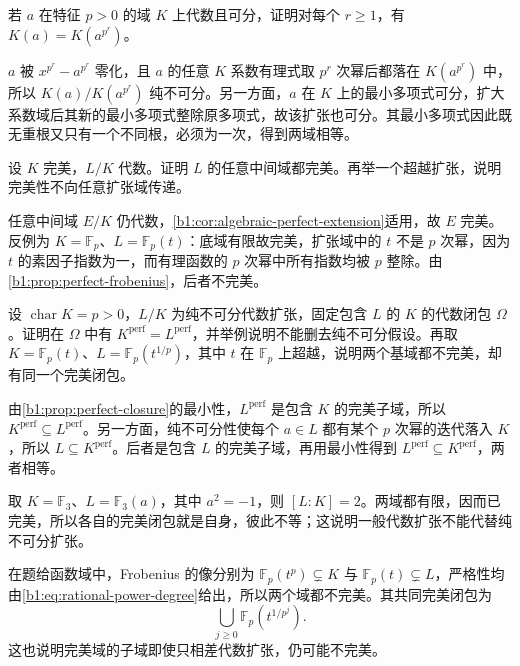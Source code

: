 \begin{exercise}\label{b1:ex:16-7}
	若 \(a\) 在特征 \(p>0\) 的域 \(K\) 上代数且可分，证明对每个 \(r\geq1\)，有 \(K(a)=K(a^{p^r})\)。
\end{exercise}
\begin{solution}
	\(a\) 被 \(x^{p^r}-a^{p^r}\) 零化，且 \(a\) 的任意 \(K\) 系数有理式取 \(p^r\) 次幂后都落在 \(K(a^{p^r})\) 中，所以 \(K(a)/K(a^{p^r})\) 纯不可分。另一方面，\(a\) 在 \(K\) 上的最小多项式可分，扩大系数域后其新的最小多项式整除原多项式，故该扩张也可分。其最小多项式因此既无重根又只有一个不同根，必须为一次，得到两域相等。
\end{solution}

\begin{exercise}\label{b1:ex:16-8}
	设 \(K\) 完美，\(L/K\) 代数。证明 \(L\) 的任意中间域都完美。再举一个超越扩张，说明完美性不向任意扩张域传递。
\end{exercise}
\begin{solution}
	任意中间域 \(E/K\) 仍代数，\cref{b1:cor:algebraic-perfect-extension}适用，故 \(E\) 完美。反例为 \(K=\mathbb F_p\)、\(L=\mathbb F_p(t)\)：底域有限故完美，扩张域中的 \(t\) 不是 \(p\) 次幂，因为 \(t\) 的素因子指数为一，而有理函数的 \(p\) 次幂中所有指数均被 \(p\) 整除。由\cref{b1:prop:perfect-frobenius}，后者不完美。
\end{solution}

\begin{exercise}\label{b1:ex:16-9}
	设 \(\operatorname{char}K=p>0\)，\(L/K\) 为纯不可分代数扩张，固定包含 \(L\) 的 \(K\) 的代数闭包 \(\Omega\)。证明在 \(\Omega\) 中有 \(K^{\mathrm{perf}}=L^{\mathrm{perf}}\)，并举例说明不能删去纯不可分假设。再取 \(K=\mathbb F_p(t)\)、\(L=\mathbb F_p(t^{1/p})\)，其中 \(t\) 在 \(\mathbb F_p\) 上超越，说明两个基域都不完美，却有同一个完美闭包。
\end{exercise}
\begin{solution}
	由\cref{b1:prop:perfect-closure}的最小性，\(L^{\mathrm{perf}}\) 是包含 \(K\) 的完美子域，所以 \(K^{\mathrm{perf}}\subseteq L^{\mathrm{perf}}\)。另一方面，纯不可分性使每个 \(a\in L\) 都有某个 \(p\) 次幂的迭代落入 \(K\)，所以 \(L\subseteq K^{\mathrm{perf}}\)。后者是包含 \(L\) 的完美子域，再用最小性得到 \(L^{\mathrm{perf}}\subseteq K^{\mathrm{perf}}\)，两者相等。

	取 \(K=\mathbb F_3\)、\(L=\mathbb F_3(a)\)，其中 \(a^2=-1\)，则 \([L:K]=2\)。两域都有限，因而已完美，所以各自的完美闭包就是自身，彼此不等；这说明一般代数扩张不能代替纯不可分扩张。

	在题给函数域中，Frobenius 的像分别为 \(\mathbb F_p(t^p)\subsetneq K\) 与 \(\mathbb F_p(t)\subsetneq L\)，严格性均由\eqref{b1:eq:rational-power-degree}给出，所以两个域都不完美。其共同完美闭包为
	\[
		\bigcup_{j\ge0}\mathbb F_p(t^{1/p^j}).
	\]
	这也说明完美域的子域即使只相差代数扩张，仍可能不完美。
\end{solution}

